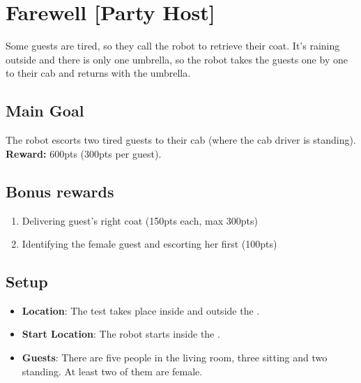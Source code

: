 \section{Farewell [Party Host]}
\label{test:farewell}
Some guests are tired, so they call the robot to retrieve their coat.
It's raining outside and there is only one umbrella, so the robot takes the guests one by one to their cab and returns with the umbrella.


\subsection*{Main Goal}
The robot escorts two tired guests to their cab (where the cab driver is standing).
\noindent\textbf{Reward:} 600pts (300pts per guest).

\subsection*{Bonus rewards}
\begin{enumerate}[nosep]
	\item Delivering guest's right coat (150pts each, max 300pts)
	\item Identifying the female guest and escorting her first (100pts)
\end{enumerate}


\subsection*{Setup}
\begin{itemize}
	\item \textbf{Location}: The test takes place inside and outside the \Arena{}.

	\item \textbf{Start Location}: The robot starts inside the \Arena{}.

	\item \textbf{Guests}: There are five people in the living room, three sitting and two standing. At least two of them are female.
\end{itemize}


